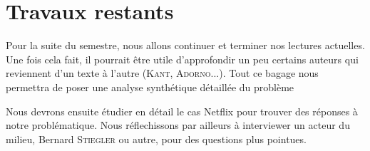 \documentclass[a4paper,10pt]{article}
\begin{document}
\section{Travaux restants}

Pour la suite du semestre, nous allons continuer et terminer nos lectures actuelles. Une fois cela fait, il pourrait être utile d'approfondir un peu certains auteurs qui reviennent d'un texte à l'autre (\textsc{Kant}, \textsc{Adorno}...). Tout ce bagage nous permettra de poser une analyse synthétique détaillée du problème

Nous devrons ensuite étudier en détail le cas Netflix pour trouver des réponses à notre problématique. Nous réflechissons par ailleurs à interviewer un acteur du milieu, Bernard \textsc{Stiegler} ou autre, pour des questions plus pointues.
\end{document}
